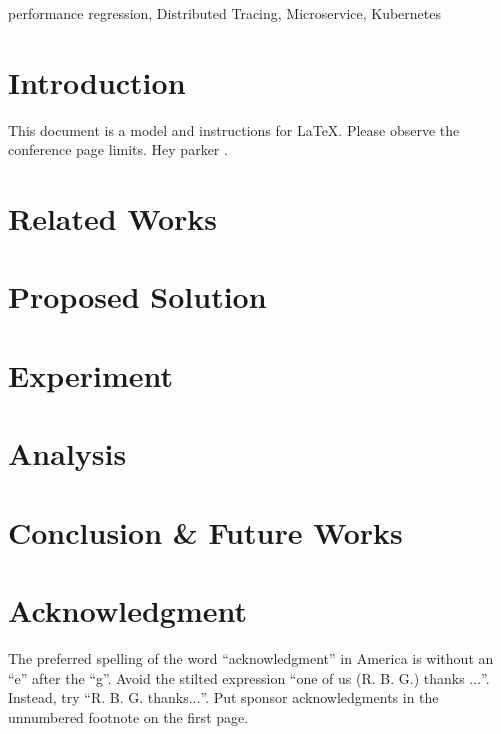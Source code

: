 \documentclass[conference]{configs/IEEEtran}
\begin{document}
\begin{abstract}
This document is a model and instructions for \LaTeX.
This and the IEEEtran.cls file define the components of your paper [title, text, heads, etc.]. *CRITICAL: Do Not Use Symbols, Special Characters, Footnotes, 
or Math in Paper Title or Abstract.
\end{abstract}

\begin{IEEEkeywords}
performance regression, Distributed Tracing, Microservice, Kubernetes
\end{IEEEkeywords}

\section{Introduction}
This document is a model and instructions for \LaTeX.
Please observe the conference page limits. Hey parker \cite{Bansal2014}. \cite{parker2020distributed}

\section{Related Works}

\section{Proposed Solution}

\section{Experiment}

\section{Analysis}

\section{Conclusion & Future Works}

\section*{Acknowledgment}

The preferred spelling of the word ``acknowledgment'' in America is without 
an ``e'' after the ``g''. Avoid the stilted expression ``one of us (R. B. 
G.) thanks $\ldots$''. Instead, try ``R. B. G. thanks$\ldots$''. Put sponsor 
acknowledgments in the unnumbered footnote on the first page.




\vspace{12pt}
\end{document}

